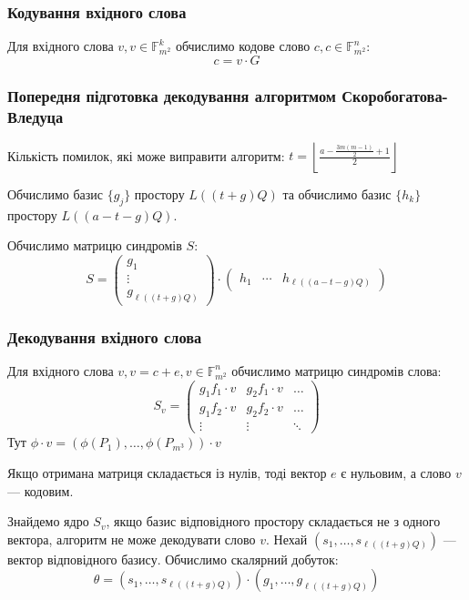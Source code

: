 \documentclass[a4paper,14pt,oneside]{extarticle}
\begin{document}
\subsubsection{Кодування вхідного слова}
Для вхідного слова $v, v\in \mathbb{F}_{m^2}^k$ обчислимо кодове слово $c, c \in \mathbb{F}_{m^2}^n$:
$$c = v \cdot G$$
 
\subsubsection{Попередня підготовка декодування алгоритмом Скоробогатова-Вледуца}
Кількість помилок, які може виправити алгоритм: $t = \left \lfloor \frac{a-\frac{3m(m-1)}{2} + 1}{2} \right \rfloor$

Обчислимо базис $\{g_j\}$ простору $L( (t+g)Q )$ та обчислимо базис $\{h_k\}$ простору $L( (a-t-g)Q)$.

Обчислимо матрицю синдромів $S$:
$$
S = 
\begin{pmatrix}
    g_1 \\
    \vdots \\
    g_{\ell( (t+g)Q )}
\end{pmatrix}
\cdot
\begin{pmatrix}
    h_1 & \cdots & h_{\ell( (a-t-g)Q)}
\end{pmatrix}
$$

\subsubsection{Декодування вхідного слова}
Для вхідного слова $v, v=c+e, v \in \mathbb{F}_{m^2}^n$ обчислимо матрицю синдромів слова:
$$
S_v = 
\begin{pmatrix}
    g_1 f_1 \cdot v & g_2 f_1 \cdot v & \dots \\
    g_1 f_2 \cdot v & g_2 f_2 \cdot v & \dots \\
    \vdots & \vdots & \ddots
\end{pmatrix}
$$
Тут $\phi \cdot v = (\phi(P_1), \dots , \phi(P_{m^3})) \cdot v$

Якщо отримана матриця складається із нулів, тоді вектор $e$ є нульовим, а слово $v$ --- кодовим.

Знайдемо ядро $S_v$, якщо базис відповідного простору складається не з одного вектора, алгоритм не може декодувати слово $v$.
Нехай $(s_1, \dots, s_{\ell( (t+g)Q )})$ --- вектор відповідного базису. Обчислимо скалярний добуток:
$$\theta = (s_1, \dots, s_{\ell( (t+g)Q )}) \cdot (g_1, \dots, g_{\ell( (t+g)Q )})$$
\end{document}

